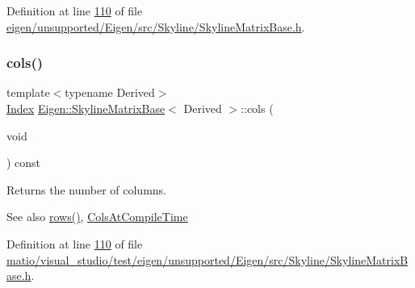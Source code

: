 Definition at line \hyperlink{eigen_2unsupported_2_eigen_2src_2_skyline_2_skyline_matrix_base_8h_source_l00110}{110} of file \hyperlink{eigen_2unsupported_2_eigen_2src_2_skyline_2_skyline_matrix_base_8h_source}{eigen/unsupported/\+Eigen/src/\+Skyline/\+Skyline\+Matrix\+Base.\+h}.

\mbox{\label{class_eigen_1_1_skyline_matrix_base_aff9cfadb45ffbae8a33b710bc9b49d71}} 
\subsubsection{\texorpdfstring{cols()}{cols()}\hspace{0.1cm}{\footnotesize\ttfamily [2/2]}}
{\footnotesize\ttfamily template$<$typename Derived$>$ \\
\hyperlink{group___core___module_a554f30542cc2316add4b1ea0a492ff02}{Index} \hyperlink{class_eigen_1_1_skyline_matrix_base}{Eigen\+::\+Skyline\+Matrix\+Base}$<$ Derived $>$\+::cols (\begin{DoxyParamCaption}\item[{void}]{ }\end{DoxyParamCaption}) const\hspace{0.3cm}{\ttfamily [inline]}}

\begin{DoxyReturn}{Returns}
the number of columns. 
\end{DoxyReturn}
\begin{DoxySeeAlso}{See also}
\hyperlink{class_eigen_1_1_skyline_matrix_base_a8243b2fe6bcc6c3037717fcb0afa9d46}{rows()}, \hyperlink{class_eigen_1_1_skyline_matrix_base_a811ba3961cb927ae5fa84ed278ebceeaa0bb8b9ae248b86ca53aff754311111e8}{Cols\+At\+Compile\+Time} 
\end{DoxySeeAlso}


Definition at line \hyperlink{matio_2visual__studio_2test_2eigen_2unsupported_2_eigen_2src_2_skyline_2_skyline_matrix_base_8h_source_l00110}{110} of file \hyperlink{matio_2visual__studio_2test_2eigen_2unsupported_2_eigen_2src_2_skyline_2_skyline_matrix_base_8h_source}{matio/visual\+\_\+studio/test/eigen/unsupported/\+Eigen/src/\+Skyline/\+Skyline\+Matrix\+Base.\+h}.

\mbox{\label{class_eigen_1_1_skyline_matrix_base_a03d2346d1bc95c63405e03b6a39d2f7e}} 
